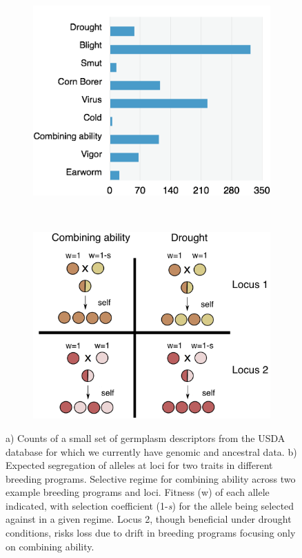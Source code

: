 \documentclass[12pt]{article}
\begin{document}
\begin{figure}[t]
        \begin{subfigure}[b]{0.5\textwidth}
                \includegraphics[width=\textwidth]{disease.png}
                \caption{}
                \label{fig:words}
        \end{subfigure}%
        ~ %
        \begin{subfigure}[b]{0.5\textwidth}
                \includegraphics[width=\textwidth]{divergent.png}
                \caption{}
                \label{fig:div}
        \end{subfigure}
\caption{a) Counts of a small set of germplasm descriptors from the USDA database for which we currently have genomic and ancestral data. b) Expected segregation of alleles at loci for two traits in different breeding programs.  Selective regime for combining ability across two example breeding programs and loci. Fitness (w) of each allele indicated, with selection coefficient (1-\textit{s}) for the allele being selected against in a given regime. Locus 2, though beneficial under drought conditions, risks loss due to drift in breeding programs focusing only on combining ability.}
\end{figure}
 
\end{document}
